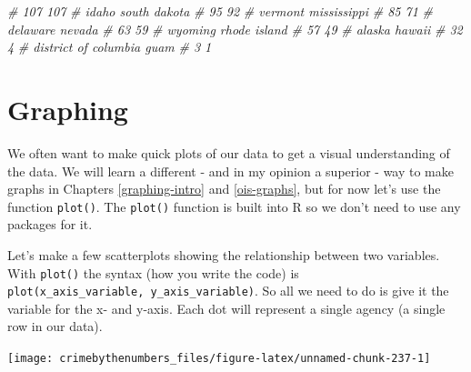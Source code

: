 \documentclass[
  a4paper,
]{krantz}
\makeatletter
\newenvironment{Shaded}{\begin{snugshade}}{\end{snugshade}}
\newcommand{\CommentTok}[1]{\textcolor[rgb]{0.37,0.37,0.37}{\textit{#1}}}
\newcommand{\FunctionTok}[1]{\textcolor[rgb]{0,0,0}{#1}}
\newcommand{\NormalTok}[1]{#1}
\newcommand{\SpecialCharTok}[1]{\textcolor[rgb]{0,0,0}{#1}}
\newenvironment{kframe}{%
\medskip{}
\setlength{\fboxsep}{.8em}
 \def\at@end@of@kframe{}%
 \ifinner\ifhmode%
  \def\at@end@of@kframe{\end{minipage}}%
  \begin{minipage}{\columnwidth}%
 \fi\fi%
 \def\FrameCommand##1{\hskip\@totalleftmargin \hskip-\fboxsep
 \colorbox{shadecolor}{##1}\hskip-\fboxsep
     \hskip-\linewidth \hskip-\@totalleftmargin \hskip\columnwidth}%
 \MakeFramed {\advance\hsize-\width
   \@totalleftmargin\z@ \linewidth\hsize
   \@setminipage}}%
 {\par\unskip\endMakeFramed%
 \at@end@of@kframe}
\renewenvironment{Shaded}{\begin{kframe}}{\end{kframe}}
\makeatother
\begin{document}
\begin{Shaded}
\begin{Highlighting}[]
\CommentTok{\#                  107                  107 }
\CommentTok{\#                idaho         south dakota }
\CommentTok{\#                   95                   92 }
\CommentTok{\#              vermont          mississippi }
\CommentTok{\#                   85                   71 }
\CommentTok{\#             delaware               nevada }
\CommentTok{\#                   63                   59 }
\CommentTok{\#              wyoming         rhode island }
\CommentTok{\#                   57                   49 }
\CommentTok{\#               alaska               hawaii }
\CommentTok{\#                   32                    4 }
\CommentTok{\# district of columbia                 guam }
\CommentTok{\#                    3                    1}
\end{Highlighting}
\end{Shaded}

\hypertarget{graphing-1}{%
\section{Graphing}\label{graphing-1}}

We often want to make quick plots of our data to get a
visual understanding of the data. We will learn a different
- and in my opinion a superior - way to make graphs in
Chapters \ref{graphing-intro} and \ref{ois-graphs}, but for
now let's use the function \texttt{plot()}. The
\texttt{plot()} function is built into R so we don't need to
use any packages for it.

Let's make a few scatterplots showing the relationship
between two variables. With \texttt{plot()} the syntax (how
you write the code) is
\texttt{plot(x\_axis\_variable,\ y\_axis\_variable)}. So all
we need to do is give it the variable for the x- and y-axis.
Each dot will represent a single agency (a single row in our
data).

\begin{Shaded}
\end{Shaded}

\begin{center}\texttt{[image: crimebythenumbers\_files/figure-latex/unnamed-chunk-237-1]} \end{center}
\end{document}
